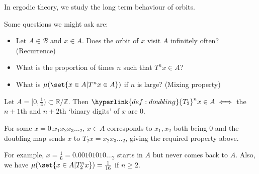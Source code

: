 \documentclass{article}
\begin{document}
In ergodic theory, we study the long term behaviour of orbits.
Some questions we might ask are:
\begin{itemize}
  \item Let $A \in \mathcal{B}$ and $x \in A$. Does the orbit of $x$ visit $A$ infinitely often? (Recurrence)
  \item What is the proportion of times $n$ such that $T^n x \in A$?
  \item What is $\mu(\set{x \in A | T^n x \in A})$ if $n$ is large? (Mixing property)
\end{itemize}

\begin{eg}
  Let $A = [0, \frac{1}{4}) \subset \mathbb{R}/\mathbb{Z}$. %
  Then $\hyperlink{def:doubling}{T_2}^n x \in A \iff $ the $n+1$th and $n+2$th `binary digits' of $x$ are $0$.

  For some $x = 0.x_1 x_2 x_3 \dots_2$, $x \in A$ corresponds to $x_1, x_2$ both being 0 and the doubling map sends $x$ to $T_2x = x_2 x_3 \dots_2$, giving the required property above.

  For example, $x = \frac{1}{6} = 0.00101010\dots_2$ starts in $A$ but never comes back to $A$.
  Also, we have $\mu(\set{x \in A | T_2^n x}) = \frac{1}{16}$ if $n \geq 2$.
\end{eg}
\end{document}

